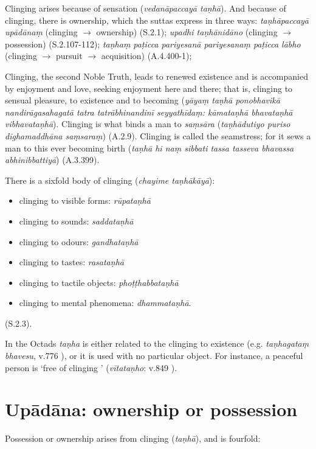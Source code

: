 Clinging arises because of sensation (\textit{vedanāpaccayā taṇhā}). And because of clinging, there is ownership, which the suttas express in three ways: \textit{taṇhāpaccayā upādānaṃ} (clinging $\rightarrow$ ownership) (S.2.1); \textit{upadhi taṇhānidāno} (clinging $\rightarrow$ possession) (S.2.107-112); \textit{taṇhaṃ paṭicca pariyesanā pariyesanaṃ paṭicca lābho} (clinging $\rightarrow$ pursuit $\rightarrow$ acquisition) (A.4.400-1);

Clinging, the second Noble Truth, leads to renewed existence and is accompanied by enjoyment and love, seeking enjoyment here and there; that is, clinging to sensual pleasure, to existence and to becoming (\textit{yāyaṃ taṇhā ponobhavikā nandirāgasahagatā tatra tatrābhinandinī seyyathīdaṃ: kāmataṇhā bhavataṇhā vibhavataṇhā}). Clinging is what binds a man to \textit{saṃs\=ara} (\textit{taṇhādutiyo puriso dīghamaddhāna saṃsaraṃ}) (A.2.9). Clinging is called the seamstress; for it sews a man to this ever becoming birth (\textit{taṇhā hi naṃ sibbati tassa tasseva bhavassa abhinibbattiyā}) (A.3.399).

There is a sixfold body of clinging (\textit{chayime taṇhākāyā}):

\begin{itemize}
\item clinging to visible forms: \textit{rūpataṇhā}
\item clinging to sounds: \textit{saddataṇhā}
\item clinging to odours: \textit{gandhataṇhā}
\item clinging to tastes: \textit{rasataṇhā}
\item clinging to tactile objects: \textit{phoṭṭhabbataṇhā}
\item clinging to mental phenomena: \textit{dhammataṇhā}.
\end{itemize}

(S.2.3).

In the Octads \textit{taṇha} is either related to the clinging to existence (e.g. \textit{taṇhagataṃ bhavesu}, v.776 ), or it is used with no particular object. For instance, a peaceful person is `free of clinging ' (\textit{vītataṇho}: v.849 ).

\section*{Up\=ad\=ana: ownership or possession}

Possession or ownership arises from clinging (\textit{taṇhā}), and is fourfold:

